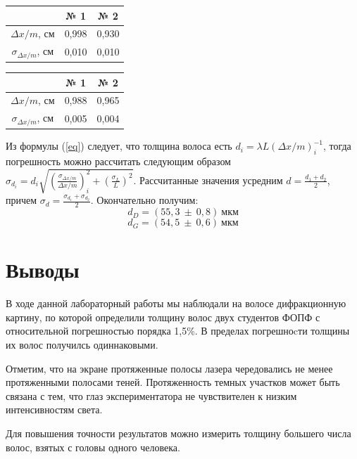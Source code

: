 \documentclass[a4paper,12pt]{article} %
\begin{document}
	\begin{table}[h!]
		\begin{floatrow}
			{	\begin{tabular}{|c|c|c|}
					\hline
					& № 1   & № 2   \\ \hline
					$\Delta x / m$, см          & 0,998 & 0,930 \\ \hline
					$\sigma_{\Delta x / m}$, см & 0,010 & 0,010 \\ \hline
			\end{tabular}}
			{\begin{tabular}{|c|c|c|}
					\hline
					& № 1   & № 2   \\ \hline
					$\Delta x / m$, см          & 0,988 & 0,965 \\ \hline
					$\sigma_{\Delta x / m}$, см & 0,005 & 0,004 \\ \hline
			\end{tabular}}        
		\end{floatrow}
	\end{table}

	Из формулы (\ref{eq}) следует, что толщина волоса есть $d_i =\lambda L (\Delta x / m)_i^{-1} $, тогда погрешность можно рассчитать следующим образом $\sigma_{d_i} = d_i \sqrt{\left(\frac{\sigma_{\Delta x / m}}{\Delta x / m}\right)_i^2 + \left(\frac{\sigma_L}{L} \right)^2}$. Рассчитанные значения усредним $d = \frac{d_1 + d_2}{2}$, причем $\sigma_d = \frac{\sigma_{d_1} + \sigma_{d_2}}{2}$. Окончательно получим:
	\[\boxed{d_D = (55,3 \ \pm \ 0,8) \ \text{мкм} }  \] \[\boxed{d_G =(54,5 \ \pm \ 0,6) \ \text{мкм} } \]
	
\section{Выводы}
	В ходе данной лабораторный работы мы наблюдали на волосе дифракционную картину, по которой определили толщину волос двух студентов ФОПФ с относительной погрешностью порядка 1,5\%. В пределах погрешноcти толщины их волос получилсь одиннаковыми.
	
	Отметим, что на экране протяженные полосы лазера чередовались не менее протяженными полосами теней. Протяженность темных участков может быть связана с тем, что глаз экспериментатора не чувствителен к низким интенсивностям света.
	
	Для повышения точности результатов можно измерить толщину большего числа волос, взятых с головы одного человека.
\end{document}
